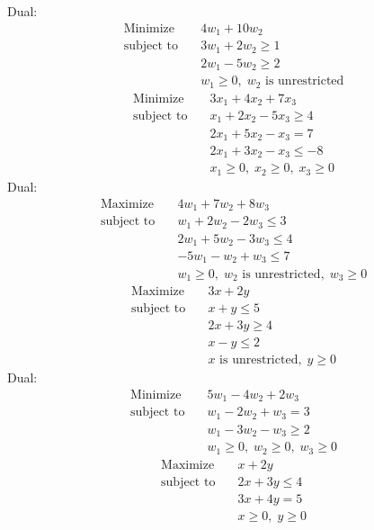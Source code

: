 \documentclass{article}
\begin{document}
Dual:\\
\begin{align*}
\text{Minimize} \quad & 4w_{1} + 10w_{2}\\
\text{subject to} \quad
& 3w_{1} + 2w_{2}\ge1\\
& 2w_{1} - 5w_{2}\ge2\\
& w_{1}\ge0,\; w_{2}\text{ is unrestricted}\end{align*}
\begin{align*}
\text{Minimize} \quad & 3x_{1} + 4x_{2} + 7x_{3}\\
\text{subject to} \quad
& x_{1} + 2x_{2} - 5x_{3}\ge4\\
& 2x_{1} + 5x_{2} - x_{3}=7\\
& 2x_{1} + 3x_{2} - x_{3}\le-8\\
& x_{1}\ge0,\; x_{2}\ge0,\; x_{3}\ge0\end{align*}
Dual:\\
\begin{align*}
\text{Maximize} \quad & 4w_{1} + 7w_{2} + 8w_{3}\\
\text{subject to} \quad
& w_{1} + 2w_{2} - 2w_{3}\le3\\
& 2w_{1} + 5w_{2} - 3w_{3}\le4\\
& -5w_{1} - w_{2} + w_{3}\le7\\
& w_{1}\ge0,\; w_{2}\text{ is unrestricted},\; w_{3}\ge0\end{align*}
\begin{align*}
\text{Maximize} \quad & 3x + 2y\\
\text{subject to} \quad
& x + y\le5\\
& 2x + 3y\ge4\\
& x - y\le2\\
& x\text{ is unrestricted},\; y\ge0\end{align*}
Dual:\\
\begin{align*}
\text{Minimize} \quad & 5w_{1} - 4w_{2} + 2w_{3}\\
\text{subject to} \quad
& w_{1} - 2w_{2} + w_{3}=3\\
& w_{1} - 3w_{2} - w_{3}\ge2\\
& w_{1}\ge0,\; w_{2}\ge0,\; w_{3}\ge0\end{align*}
\begin{align*}
\text{Maximize} \quad & x + 2y\\
\text{subject to} \quad
& 2x + 3y\le4\\
& 3x + 4y=5\\
& x\ge0,\; y\ge0\end{align*}
\end{document}
